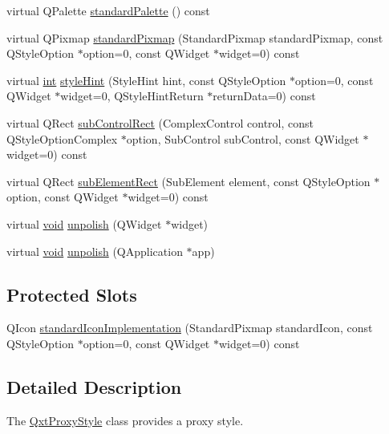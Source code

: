 \begin{DoxyCompactItemize}
virtual Q\-Palette \hyperlink{class_qxt_proxy_style_acf379e2b32b203b311b8d2ee80e53c90}{standard\-Palette} () const 
\item 
virtual Q\-Pixmap \hyperlink{class_qxt_proxy_style_ab584811e6292ee9c62856eef4d778aa0}{standard\-Pixmap} (Standard\-Pixmap standard\-Pixmap, const Q\-Style\-Option $\ast$option=0, const Q\-Widget $\ast$widget=0) const 
\item 
virtual \hyperlink{ioapi_8h_a787fa3cf048117ba7123753c1e74fcd6}{int} \hyperlink{class_qxt_proxy_style_a7b927e90827227436e2904587792ac74}{style\-Hint} (Style\-Hint hint, const Q\-Style\-Option $\ast$option=0, const Q\-Widget $\ast$widget=0, Q\-Style\-Hint\-Return $\ast$return\-Data=0) const 
\item 
virtual Q\-Rect \hyperlink{class_qxt_proxy_style_a1dc665ce0f1a426472006786e94749bf}{sub\-Control\-Rect} (Complex\-Control control, const Q\-Style\-Option\-Complex $\ast$option, Sub\-Control sub\-Control, const Q\-Widget $\ast$widget=0) const 
\item 
virtual Q\-Rect \hyperlink{class_qxt_proxy_style_a220291ef760c56678bf46305545d5a25}{sub\-Element\-Rect} (Sub\-Element element, const Q\-Style\-Option $\ast$option, const Q\-Widget $\ast$widget=0) const 
\item 
virtual \hyperlink{group___u_a_v_objects_plugin_ga444cf2ff3f0ecbe028adce838d373f5c}{void} \hyperlink{class_qxt_proxy_style_aee33b6da70a8606a9b74b86b3a93ff9f}{unpolish} (Q\-Widget $\ast$widget)
\item 
virtual \hyperlink{group___u_a_v_objects_plugin_ga444cf2ff3f0ecbe028adce838d373f5c}{void} \hyperlink{class_qxt_proxy_style_a703ddd02b7d92996480a16a8a3db3458}{unpolish} (Q\-Application $\ast$app)
\end{DoxyCompactItemize}
\subsection*{Protected Slots}
\begin{DoxyCompactItemize}
\item 
Q\-Icon \hyperlink{class_qxt_proxy_style_a4e25225683737fe2006255ae508666d2}{standard\-Icon\-Implementation} (Standard\-Pixmap standard\-Icon, const Q\-Style\-Option $\ast$option=0, const Q\-Widget $\ast$widget=0) const 
\end{DoxyCompactItemize}


\subsection{Detailed Description}
The \hyperlink{class_qxt_proxy_style}{Qxt\-Proxy\-Style} class provides a proxy style. 

